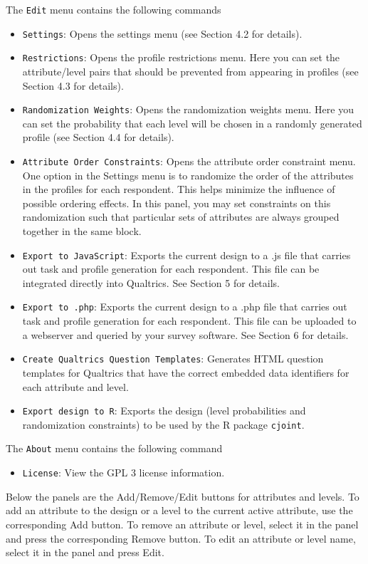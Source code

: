 \documentclass[12pt]{article}
\begin{document}
The \texttt{Edit} menu contains the following commands
\begin{itemize}
\item \texttt{Settings}: Opens the settings menu (see Section 4.2 for details).
\item \texttt{Restrictions}: Opens the profile restrictions menu. Here you can set the attribute/level pairs that should be prevented from appearing in profiles (see Section 4.3 for details).
\item \texttt{Randomization Weights}: Opens the randomization weights menu. Here you can set the probability that each level will be chosen in a randomly generated profile (see Section 4.4 for details).
\item \texttt{Attribute Order Constraints}: Opens the attribute order constraint menu. One option in the Settings menu is to randomize the order of the attributes in the profiles for each respondent. This helps minimize the influence of possible ordering effects. In this panel, you may set constraints on this randomization such that particular sets of attributes are always grouped together in the same block.
\item \texttt{Export to JavaScript}: Exports the current design to a .js file that carries out task and profile generation for each respondent. This file can be integrated directly into Qualtrics. See Section 5 for details.
\item \texttt{Export to .php}: Exports the current design to a .php file that carries out task and profile generation for each respondent. This file can be uploaded to a webserver and queried by your survey software. See Section 6 for details.
\item \texttt{Create Qualtrics Question Templates}: Generates HTML question templates for Qualtrics that have the correct embedded data identifiers for each attribute and level.
\item \texttt{Export design to R}: Exports the design (level probabilities and randomization constraints) to be used by the R package \texttt{cjoint}. 
\end{itemize}

The \texttt{About} menu contains the following command
\begin{itemize}
\item \texttt{License}: View the GPL 3 license information.
\end{itemize}

Below the panels are the Add/Remove/Edit buttons for attributes and levels. To add an attribute to the design or a level to the current active attribute, use the corresponding Add button. To remove an attribute or level, select it in the panel and press the corresponding Remove button. To edit an attribute or level name, select it in the panel and press Edit.
\end{document}
